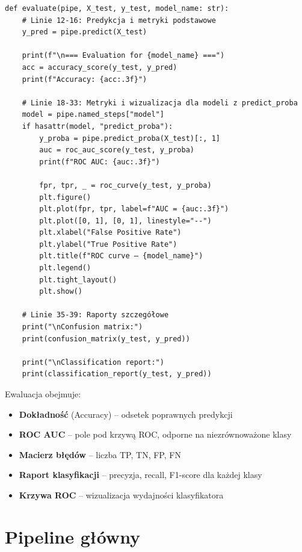 \documentclass[12pt]{article}
\begin{document}
\begin{lstlisting}[caption={\texttt{src/evaluate.py} (linie 11--39): Funkcja ewaluacji}]
def evaluate(pipe, X_test, y_test, model_name: str):
    # Linie 12-16: Predykcja i metryki podstawowe
    y_pred = pipe.predict(X_test)

    print(f"\n=== Evaluation for {model_name} ===")
    acc = accuracy_score(y_test, y_pred)
    print(f"Accuracy: {acc:.3f}")

    # Linie 18-33: Metryki i wizualizacja dla modeli z predict_proba
    model = pipe.named_steps["model"]
    if hasattr(model, "predict_proba"):
        y_proba = pipe.predict_proba(X_test)[:, 1]
        auc = roc_auc_score(y_test, y_proba)
        print(f"ROC AUC: {auc:.3f}")

        fpr, tpr, _ = roc_curve(y_test, y_proba)
        plt.figure()
        plt.plot(fpr, tpr, label=f"AUC = {auc:.3f}")
        plt.plot([0, 1], [0, 1], linestyle="--")
        plt.xlabel("False Positive Rate")
        plt.ylabel("True Positive Rate")
        plt.title(f"ROC curve – {model_name}")
        plt.legend()
        plt.tight_layout()
        plt.show()

    # Linie 35-39: Raporty szczegółowe
    print("\nConfusion matrix:")
    print(confusion_matrix(y_test, y_pred))

    print("\nClassification report:")
    print(classification_report(y_test, y_pred))
\end{lstlisting}

\noindent
\begin{tcolorbox}[colframe=red!75!black, colback=red!10, title={\large Metryki ewaluacji}, fonttitle=\bfseries]
Ewaluacja obejmuje:
\begin{itemize}
    \item \textbf{Dokładność} (Accuracy) – odsetek poprawnych predykcji
    \item \textbf{ROC AUC} – pole pod krzywą ROC, odporne na niezrównoważone klasy
    \item \textbf{Macierz błędów} – liczba TP, TN, FP, FN
    \item \textbf{Raport klasyfikacji} – precyzja, recall, F1-score dla każdej klasy
    \item \textbf{Krzywa ROC} – wizualizacja wydajności klasyfikatora
\end{itemize}
\end{tcolorbox}

\section{Pipeline główny}
\end{document}
